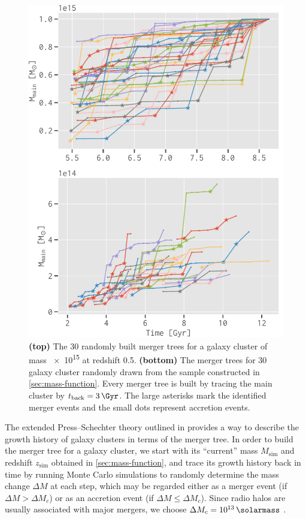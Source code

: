 \documentclass[twocolumn]{aastex62}
\newcommand{\R}[1]{\mathrm{#1}}
\newcommand{\editone}[1]{{\leavevmode\color{cyan}#1}}
\begin{document}
\begin{figure}
  \centering
  \includegraphics[width=\columnwidth]{merging-history}
  \caption{\label{fig:merging-history}\editone{%
    \textbf{(top)} The 30 randomly built merger trees for a galaxy cluster
    of mass \SI{e15}{\solarmass} at redshift 0.5.
    \textbf{(bottom)} The merger trees for 30 galaxy cluster randomly drawn
    from the sample constructed in \autoref{sec:mass-function}.
    Every merger tree is built by tracing the main cluster by
    $t_{\R{back}} = \SI{3}{\Gyr}$.
    The large asterisks mark the identified merger events and the small
    dots represent accretion events.
  }}
\end{figure}

The extended Press--Schechter theory outlined in \citet{lacey1993} provides
a way to describe the growth history of galaxy clusters in terms of the
merger tree.
In order to build the merger tree for a galaxy cluster, we start with
its \enquote{current} mass $M_{\R{sim}}$ and redshift $z_{\R{sim}}$ obtained
in \autoref{sec:mass-function}, and trace its growth history back in time
by running Monte Carlo simulations to randomly determine the mass change
$\Delta M$ at each step, which may be regarded either as a merger event
(if $\Delta M > \Delta M_c$) or as an accretion event
(if $\Delta M \leq \Delta M_c$).
Since radio halos are usually associated with major mergers, we choose
$\Delta M_c = \SI{e13}{\solarmass}$ \citep[e.g.,][]{cassano2005}.
\end{document}
